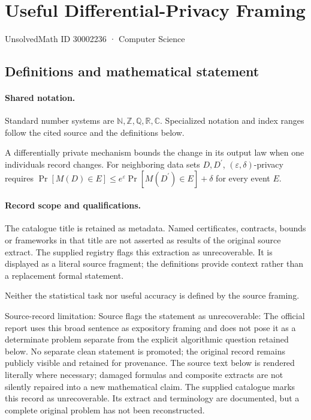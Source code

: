 \documentclass[11pt]{article}
\begin{document}
\setcounter{section}{30002235}
\section{Useful Differential-Privacy Framing}\label{30002236}
{\small\sffamily UnsolvedMath ID 30002236 · Computer Science}
\subsection{Definitions and mathematical statement}

\paragraph{Shared notation.}Standard number systems are $\mathbb N,\mathbb Z,\mathbb Q,\mathbb R,\mathbb C$. Specialized notation and index ranges follow the cited source and the definitions below.


A differentially private mechanism bounds the change in its output law when one individual\textquotesingle s record changes. For neighboring data sets $D,D^{\prime}$, $(\varepsilon,\delta)$-privacy requires $\Pr[M(D)\in E]\leq e^\varepsilon\Pr[M(D^{\prime})\in E]+\delta$ for every event $E$.
\paragraph{Record scope and qualifications.}
The catalogue title is retained as metadata. Named certificates, contracts, bounds or frameworks in that title are not asserted as results of the original source extract.
The supplied registry flags this extraction as unrecoverable. It is displayed as a literal source fragment; the definitions provide context rather than a replacement formal statement.

Neither the statistical task nor useful accuracy is defined by the source framing.

Source-record limitation: Source flags the statement as unrecoverable: The official report uses this broad sentence as expository framing and does not pose it as a determinate problem separate from the explicit algorithmic question retained below. No separate clean statement is promoted; the original record remains publicly visible and retained for provenance.
The source text below is rendered literally where necessary; damaged formulas and composite extracts are not silently repaired into a new mathematical claim.
The supplied catalogue marks this record as unrecoverable. Its extract and terminology are documented, but a complete original problem has not been reconstructed.
\end{document}
